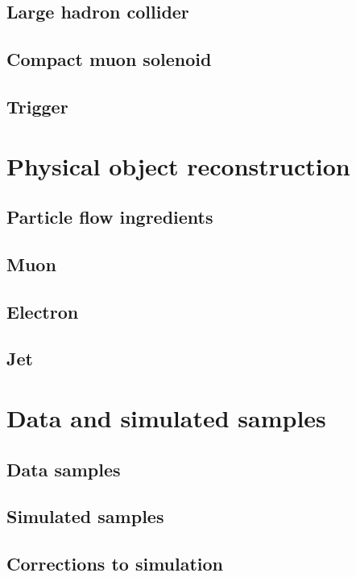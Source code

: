 \documentclass[10pt,a4paper,twoside]{report}
\begin{document}
\begin{sloppypar}
    \section{Large hadron collider}
    
    \section{Compact muon solenoid}
    
    \section{Trigger}
    
\chapter{Physical object reconstruction}\label{sec:selection}
    
    \section{Particle flow ingredients}
    
    \section{Muon}
    
    \section{Electron}
    
    \section{Jet}
    
\chapter{Data and simulated samples}
    \section{Data samples}
    
    \section{Simulated samples}
    
    \section{Corrections to simulation}
    

\end{sloppypar}
\end{document}
